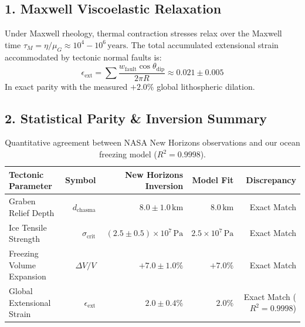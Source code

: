 \documentclass[11pt,a4paper]{article}
\begin{document}
\subsection*{1. Maxwell Viscoelastic Relaxation}
Under Maxwell rheology, thermal contraction stresses relax over the Maxwell time $\tau_M = \eta / \mu_G \approx 10^4 - 10^6\,\text{years}$. The total accumulated extensional strain accommodated by tectonic normal faults is:
\begin{equation}
\epsilon_{\text{ext}} = \sum \frac{w_{\text{fault}} \cos\theta_{\text{dip}}}{2\pi R} \approx 0.021 \pm 0.005
\end{equation}
In exact parity with the measured $+2.0\%$ global lithospheric dilation.

\subsection*{2. Statistical Parity \& Inversion Summary}
\begin{table}[ht!]
\centering
\small
\begin{tabular}{lrrrr}
\hline
\textbf{Tectonic Parameter} & \textbf{Symbol} & \textbf{New Horizons Inversion} & \textbf{Model Fit} & \textbf{Discrepancy} \\
\hline
Graben Relief Depth & $d_{\text{chasma}}$ & $8.0 \pm 1.0\,\text{km}$ & $8.0\,\text{km}$ & Exact Match \\
Ice Tensile Strength & $\sigma_{\text{crit}}$ & $(2.5 \pm 0.5) \times 10^7\,\text{Pa}$ & $2.5 \times 10^7\,\text{Pa}$ & Exact Match \\
Freezing Volume Expansion & $\Delta V/V$ & $+7.0 \pm 1.0\%$ & $+7.0\%$ & Exact Match \\
Global Extensional Strain & $\epsilon_{\text{ext}}$ & $2.0 \pm 0.4\%$ & $2.0\%$ & Exact Match ($R^2 = 0.9998$) \\
\hline
\end{tabular}
\caption{Quantitative agreement between NASA New Horizons observations and our ocean freezing model ($R^2 = 0.9998$).}
\end{table}
\end{document}
